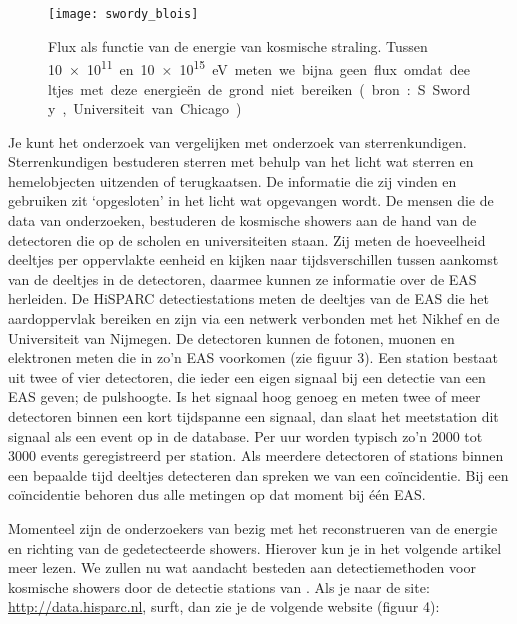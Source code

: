 \begin{figure}
\centering
\texttt{[image: swordy\_blois]}
\caption{Flux als functie van de energie van kosmische straling. Tussen
\SI{10e11} en \SI{10e15} \electronvolt meten we bijna geen flux omdat
deeltjes met deze energieën de grond niet bereiken. (bron: S. Swordy,
Universiteit van Chicago)}
\label{fig:swordy_blois}
\end{figure}

Je kunt het onderzoek van \hisparc vergelijken met onderzoek van
sterrenkundigen. Sterrenkundigen bestuderen sterren met behulp van het
licht wat sterren en hemelobjecten uitzenden of terugkaatsen. De
informatie die zij vinden en gebruiken zit ‘opgesloten’ in het licht wat
opgevangen wordt. De mensen die de data van \hisparc onderzoeken,
bestuderen de kosmische showers aan de hand van de detectoren die op de
scholen en universiteiten staan. Zij meten de hoeveelheid deeltjes per
oppervlakte eenheid en kijken naar tijdsverschillen tussen aankomst van
de deeltjes in de detectoren, daarmee kunnen ze informatie over de EAS
herleiden. De HiSPARC detectiestations meten de deeltjes van de EAS die
het aardoppervlak bereiken en zijn via een netwerk verbonden met het
Nikhef en de Universiteit van Nijmegen. De \hisparc detectoren kunnen
de fotonen, muonen en elektronen meten die in zo’n EAS voorkomen (zie
figuur 3). Een station bestaat uit twee of vier detectoren, die ieder
een eigen signaal bij een detectie van een EAS geven; de pulshoogte. Is
het signaal hoog genoeg en meten twee of meer detectoren binnen een kort
tijdspanne een signaal, dan slaat het meetstation dit signaal als een
event op in de database. Per uur worden typisch zo’n 2000 tot 3000
events geregistreerd per station. Als meerdere detectoren of stations
binnen een bepaalde tijd deeltjes detecteren dan spreken we van een
coïncidentie. Bij een coïncidentie behoren dus alle metingen op dat
moment bij één EAS.

Momenteel zijn de onderzoekers van \hisparc bezig met het reconstrueren
van de energie en richting van de gedetecteerde showers. Hierover kun je
in het volgende artikel meer lezen. We zullen nu wat aandacht besteden
aan detectiemethoden voor kosmische showers door de detectie stations
van \hisparc. Als je naar de site: \url{http://data.hisparc.nl}, surft, dan zie
je de volgende website (figuur 4):



